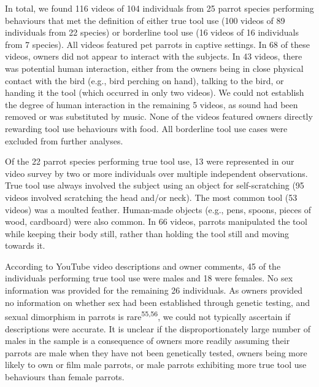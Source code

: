 \documentclass[
  man, donotrepeattitle,floatsintext]{apa6}
\begin{document}
In total, we found 116 videos of
104 individuals from
25
parrot species performing behaviours that met the definition of either true tool
use (100 videos of
89
individuals from
22
species) or borderline tool use (16 videos of
16
individuals from
7
species). All videos featured pet parrots in captive settings. In
68 of these
videos, owners did not appear to interact with the subjects. In
43 videos,
there was potential human interaction, either from the owners being in close physical
contact with the bird (e.g., bird perching on hand), talking to the bird, or
handing it the tool (which occurred in only two videos). We could not establish
the degree of human interaction in the remaining
5
videos, as sound had been removed or was substituted by music. None of the
videos featured owners directly rewarding tool use behaviours with food. All
borderline tool use cases were excluded from further analyses.

Of the 22
parrot species performing true tool use,
13
were represented in our video survey by two or more individuals over multiple
independent observations. True tool use always involved the subject using an
object for self-scratching (95
videos involved scratching the head and/or neck). The most common tool (53
videos) was a moulted feather. Human-made objects (e.g., pens, spoons, pieces of
wood, cardboard) were also common. In 66
videos, parrots manipulated the tool while keeping their body still, rather than
holding the tool still and moving towards it.

According to YouTube video descriptions and owner comments,
45
of the individuals performing true tool use were males and
18
were females. No sex information was provided for the remaining
26
individuals. As owners provided no information on whether sex had been
established through genetic testing, and sexual dimorphism in parrots is
rare\textsuperscript{55,56}, we could not typically ascertain if descriptions
were accurate. It is unclear if the disproportionately large number of males in
the sample is a consequence of owners more readily assuming their parrots are
male when they have not been genetically tested, owners being more likely to own
or film male parrots, or male parrots exhibiting more true tool use behaviours
than female parrots.
\end{document}
